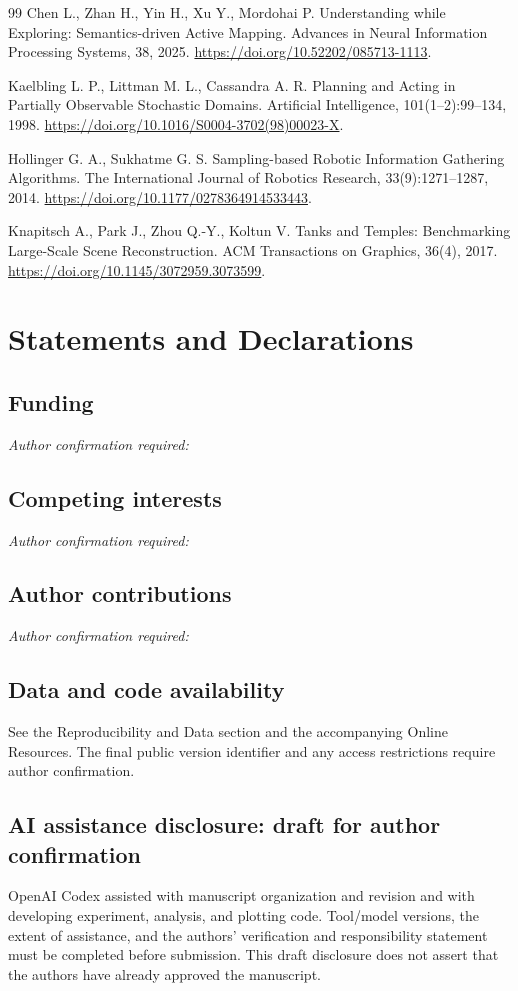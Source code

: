 \documentclass[11pt,a4paper]{article}
\begin{document}
\begin{thebibliography}{99}
 Chen L., Zhan H., Yin H., Xu Y., Mordohai P. Understanding while Exploring: Semantics-driven Active Mapping. Advances in Neural Information Processing Systems, 38, 2025. \url{https://doi.org/10.52202/085713-1113}.

 Kaelbling L. P., Littman M. L., Cassandra A. R. Planning and Acting in Partially Observable Stochastic Domains. Artificial Intelligence, 101(1--2):99--134, 1998. \url{https://doi.org/10.1016/S0004-3702(98)00023-X}.

 Hollinger G. A., Sukhatme G. S. Sampling-based Robotic Information Gathering Algorithms. The International Journal of Robotics Research, 33(9):1271--1287, 2014. \url{https://doi.org/10.1177/0278364914533443}.

 Knapitsch A., Park J., Zhou Q.-Y., Koltun V. Tanks and Temples: Benchmarking Large-Scale Scene Reconstruction. ACM Transactions on Graphics, 36(4), 2017. \url{https://doi.org/10.1145/3072959.3073599}.
\end{thebibliography}

\section*{Statements and Declarations}
\subsection*{Funding}
\textit{Author confirmation required:} \underline{\hspace{5cm}}
\subsection*{Competing interests}
\textit{Author confirmation required:} \underline{\hspace{5cm}}
\subsection*{Author contributions}
\textit{Author confirmation required:} \underline{\hspace{5cm}}
\subsection*{Data and code availability}
See the Reproducibility and Data section and the accompanying Online Resources.
The final public version identifier and any access restrictions require author confirmation.
\subsection*{AI assistance disclosure: draft for author confirmation}
OpenAI Codex assisted with manuscript organization and revision and with developing
experiment, analysis, and plotting code. Tool/model versions, the extent of assistance,
and the authors' verification and responsibility statement must be completed before submission.
This draft disclosure does not assert that the authors have already approved the manuscript.
\end{document}
